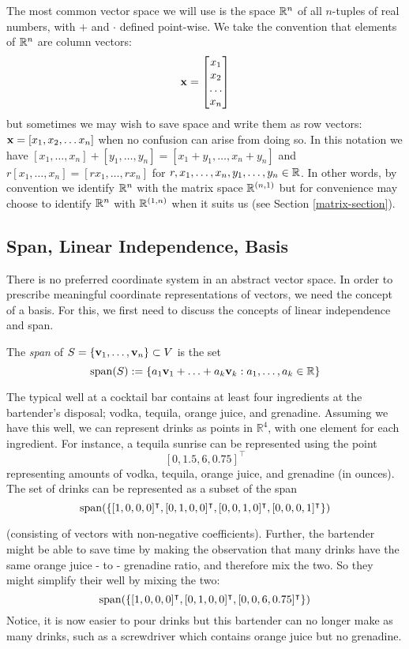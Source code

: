 The most common vector space we will use is the space $\R^n$ of all $n$-tuples of real numbers, with $+$ and $\cdot$ defined point-wise. We take the convention that elements of $\R^n$ are column vectors:
$$\vx = \begin{bmatrix}x_1\\x_2\\\dots\\x_n\end{bmatrix}$$
but sometimes we may wish to save space and write them as row vectors:
$\vx = [x_1, x_2, \dots x_n]$ when no confusion can arise from doing so. In this notation we have $[x_1,\dots,x_n] + [y_1,\dots,y_n] = [x_1+y_1,\dots,x_n+y_n]$ and $r[x_1,\dots,x_n] = [rx_1,\dots,rx_n]$ for $r, x_1,\dots,x_n,y_1,\dots,y_n\in\R$. In other words, by convention we identify $\R^n$ with the matrix space $\R^{(n,1)}$ but for convenience may choose to identify $\R^n$ with $\R^{(1,n)}$ when it suits us (see Section \ref{matrix-section}). 

\subsection{Span, Linear Independence, Basis}

There is no preferred coordinate system in an abstract vector space. In order to prescribe meaningful coordinate representations of vectors, we need the concept of a basis. For this, we first need to discuss the concepts of linear independence and span.

\begin{definition}
The \textit{span} of $S = \{\vv_1, \ldots, \vv_n \} \subset V$ is the set 
$$\spann(S) := \{a_1\vv_1 + \ldots + a_k \vv_k : a_1,\dots,a_k \in \mathbb R \}$$
\end{definition}

\begin{example}
The typical well at a cocktail bar contains at least four ingredients at the bartender's disposal; vodka, tequila, orange juice, and grenadine. Assuming we have this well, we can represent drinks as points in $\mathbb R^4$, with one element for each ingredient. For instance, a tequila sunrise can be represented using the point 
$$[0, 1.5, 6, 0.75]^\intercal$$
representing amounts of vodka, tequila, orange juice, and grenadine (in ounces). The set of drinks can be represented as a subset of the span 
$$\spann(\{ [1,0,0,0]^\intercal, [0,1,0,0]^\intercal, [0,0,1,0]^\intercal,[0,0,0,1]^\intercal\})$$

(consisting of vectors with non-negative coefficients). Further, the bartender might be able to save time by making the observation that many drinks have the same orange juice - to - grenadine ratio, and therefore mix the two. So they might simplify their well by mixing the two: 
$$\spann(\{[1,0,0,0]^\intercal, [0,1,0,0]^\intercal, [0,0,6,0.75]^\intercal\})$$
Notice, it is now easier to pour drinks but this bartender can no longer make as many drinks, such as a screwdriver which contains orange juice but no grenadine.  
\end{example}

